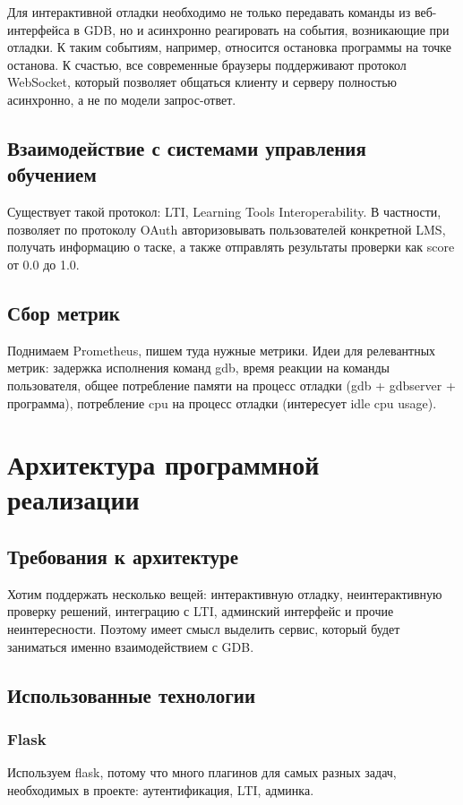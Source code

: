 \documentclass[a4paper,article,14pt]{extarticle}
\begin{document}
Для интерактивной отладки необходимо не только передавать команды из веб-интерфейса в GDB, но и асинхронно реагировать на события, возникающие при отладки. К таким событиям, например, относится остановка программы на точке останова. К счастью, все современные браузеры поддерживают протокол WebSocket, который позволяет общаться клиенту и серверу полностью асинхронно, а не по модели запрос-ответ.

\subsection{Взаимодействие с системами управления обучением}

Существует такой протокол: LTI, Learning Tools Interoperability. В частности, позволяет по протоколу OAuth авторизовывать пользователей конкретной LMS, получать информацию о таске, а также отправлять результаты проверки как score от 0.0 до 1.0.

\subsection{Сбор метрик}

Поднимаем Prometheus, пишем туда нужные метрики. Идеи для релевантных метрик: задержка исполнения команд gdb, время реакции на команды пользователя, общее потребление памяти на процесс отладки (gdb + gdbserver + программа), потребление cpu на процесс отладки (интересует idle cpu usage).

\section{Архитектура программной реализации}

\subsection{Требования к архитектуре}

Хотим поддержать несколько вещей: интерактивную отладку, неинтерактивную проверку решений, интеграцию с LTI, админский интерфейс и прочие неинтересности. Поэтому имеет смысл выделить сервис, который будет заниматься именно взаимодействием с GDB.

\subsection{Использованные технологии}

\subsubsection{Flask}
Используем flask, потому что много плагинов для самых разных задач, необходимых в проекте: аутентификация, LTI, админка.
\end{document}
